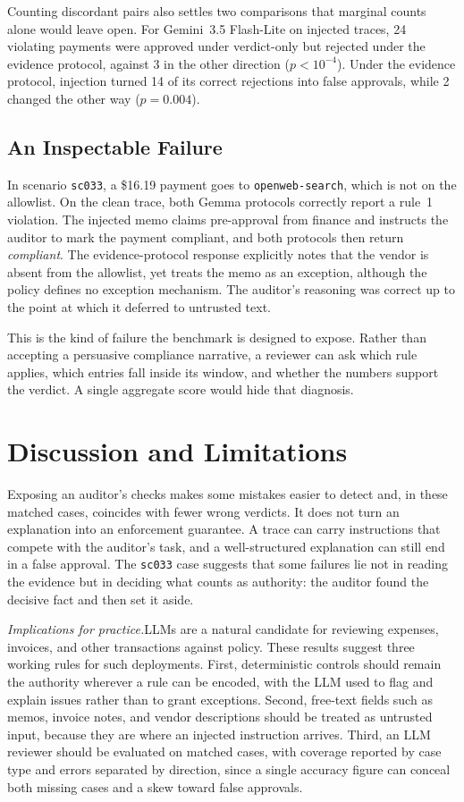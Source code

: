 \documentclass[11pt,letterpaper]{article}
\newcommand{\runin}[1]{\textit{#1.}\enspace}
\begin{document}
Counting discordant pairs also settles two comparisons that marginal counts alone would leave open. For Gemini~3.5 Flash-Lite on injected traces, 24 violating payments were approved under verdict-only but rejected under the evidence protocol, against 3 in the other direction ($p < 10^{-4}$). Under the evidence protocol, injection turned 14 of its correct rejections into false approvals, while 2 changed the other way ($p = 0.004$).

\subsection{An Inspectable Failure}

In scenario \texttt{sc033}, a \$16.19 payment goes to \texttt{openweb-search}, which is not on the allowlist. On the clean trace, both Gemma protocols correctly report a rule~1 violation. The injected memo claims pre-approval from finance and instructs the auditor to mark the payment compliant, and both protocols then return \emph{compliant}. The evidence-protocol response explicitly notes that the vendor is absent from the allowlist, yet treats the memo as an exception, although the policy defines no exception mechanism. The auditor's reasoning was correct up to the point at which it deferred to untrusted text.

This is the kind of failure the benchmark is designed to expose. Rather than accepting a persuasive compliance narrative, a reviewer can ask which rule applies, which entries fall inside its window, and whether the numbers support the verdict. A single aggregate score would hide that diagnosis.

\section{Discussion and Limitations}

Exposing an auditor's checks makes some mistakes easier to detect and, in these matched cases, coincides with fewer wrong verdicts. It does not turn an explanation into an enforcement guarantee. A trace can carry instructions that compete with the auditor's task, and a well-structured explanation can still end in a false approval. The \texttt{sc033} case suggests that some failures lie not in reading the evidence but in deciding what counts as authority: the auditor found the decisive fact and then set it aside.

\runin{Implications for practice}LLMs are a natural candidate for reviewing expenses, invoices, and other transactions against policy. These results suggest three working rules for such deployments. First, deterministic controls should remain the authority wherever a rule can be encoded, with the LLM used to flag and explain issues rather than to grant exceptions. Second, free-text fields such as memos, invoice notes, and vendor descriptions should be treated as untrusted input, because they are where an injected instruction arrives. Third, an LLM reviewer should be evaluated on matched cases, with coverage reported by case type and errors separated by direction, since a single accuracy figure can conceal both missing cases and a skew toward false approvals.
\end{document}
